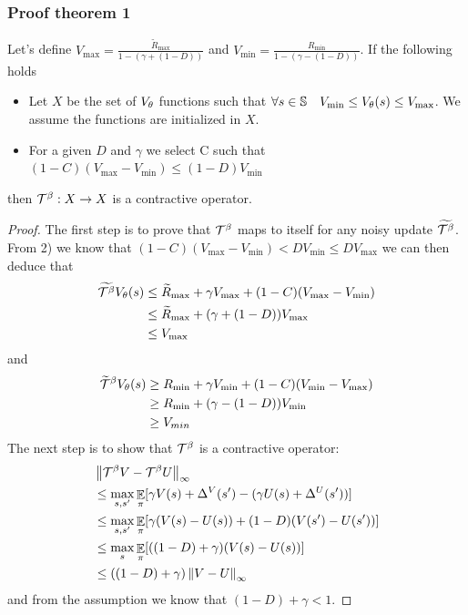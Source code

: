 \subsubsection{Proof theorem 1}\label{proof}
\setcounter{theorem}{0}
\begin{theorem}
Let's define $V_{\max} = \frac{\widetilde{R}_{\max}}{1-(\gamma+(1-D))}$ and $V_{\min} = \frac{R_{\min}}{1-(\gamma-(1-D))}$. If the following holds
\begin{itemize}
    \item Let $X$ be the set of $V_{\theta}$ functions such that $\forall s \in \mathbb{S} \quad  V_{\min} \leq V_{\theta}(s) \leq V_{\max}$. We assume the functions are initialized in $X$.
    \item For a given $D$ and $\gamma$ we select C such that $(1-C)(V_{\max}-V_{\min}) \leq (1-D)V_{\min}$
\end{itemize}
then $\mathcal{T}^{\beta}: X \rightarrow X$ is a contractive operator.
\end{theorem}
\begin{proof}
The first step is to prove that $\mathcal{T}^{\beta}$ maps to itself for any noisy update $\widetilde{\mathcal{T}^{\beta}}$. 
From 2) we know that
$(1-C) (V_{\max} - V_{\min}) < D V_{\min} \leq D V_{\max}$ we can then deduce that
\begin{equation}
    \begin{split}
        \widetilde{\mathcal{T}^{\beta}}V_{\theta}(s) &\leq \widetilde{R}_{\max} + \gamma V_{\max} +(1-C)(V_{\max} - V_{\min}) \\
        &\leq \widetilde{R}_{\max} + (\gamma+(1-D)) V_{\max} \\
        &\leq V_{\max}
    \end{split}
\end{equation}
and
\begin{equation}
    \begin{split}
        \widetilde{\mathcal{T}}^{\beta}V_{\theta}(s) &\geq R_{\min} + \gamma V_{\min} + (1-C)(V_{\min} - V_{\max})\\
        &\geq R_{\min} + (\gamma-(1-D)) V_{\min}\\
        &\geq V_{min}\\
    \end{split}
\end{equation}
The next step is to show that $\mathcal{T}^{\beta}$ is a contractive operator:
\begin{equation}
\begin{split}
    &\left\lVert\mathcal{T}^{\beta}V - \mathcal{T}^{\beta}U\right\rVert_{\infty}\\
    &\leq \max_{s,s'}\mathop{\mathbb{E}}_{\pi}[\gamma V(s) + \Delta^V(s') - (\gamma U(s) + \Delta^U(s'))] \\
    &\leq \max_{s,s'}\mathop{\mathbb{E}}_{\pi}[\gamma (V(s)-U(s)) + (1-D)(V(s') -U(s'))]\\
    &\leq \max_{s}\mathop{\mathbb{E}}_{\pi}[((1-D)+\gamma)(V(s) - U(s))]\\
    &\leq ((1-D)+\gamma) \left\lVert V - U\right\rVert_{\infty}
\end{split}
\end{equation}
and from the assumption we know that $(1-D)+\gamma < 1$.
\end{proof}
